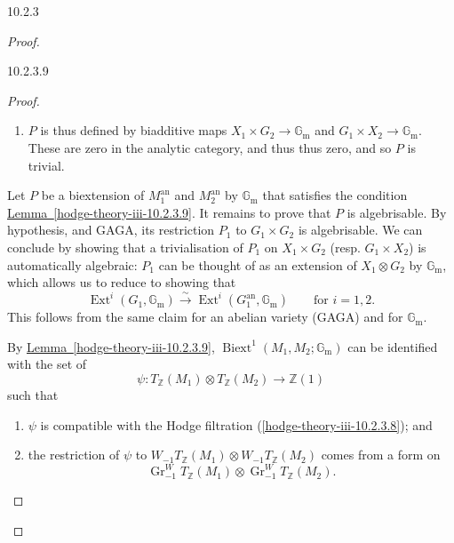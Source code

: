 \begin{construction}{10.2.3}
\begin{proof}
\begin{lemma}{10.2.3.9}
\begin{proof}
\begin{enumerate}
            
 \item[(b)]
              \(P\) is thus defined by biadditive maps \(X_1\times  G_2\to \mathbb {G}_\mathrm {m}\) and \(G_1\times  X_2\to \mathbb {G}_\mathrm {m}\).
              These are zero in the analytic category, and thus thus zero, and so \(P\) is trivial.
            

          \end{enumerate}\par{}Let \(P\) be a biextension of \(M_1^\mathrm {an}\) and \(M_2^\mathrm {an}\) by \(\mathbb {G}_\mathrm {m}\) that satisfies the condition \hyperref[hodge-theory-iii-10.2.3.9]{Lemma~\ref*{hodge-theory-iii-10.2.3.9}}.
          It remains to prove that \(P\) is algebrisable.
          By hypothesis, and GAGA, its restriction \(P_1\) to \(G_1\times  G_2\) is algebrisable.
          We can conclude by showing that a trivialisation of \(P_1\) on \(X_1\times  G_2\) (resp. \(G_1\times  X_2\)) is automatically algebraic: \(P_1\) can be thought of as an extension of \(X_1\otimes  G_2\) by \(\mathbb {G}_\mathrm {m}\), which allows us to reduce to showing that
          \[             \operatorname {Ext}^i(G_1,\mathbb {G}_\mathrm {m})             \xrightarrow {\sim } \operatorname {Ext}^i(G_1^\mathrm {an},\mathbb {G}_\mathrm {m})             \qquad \text {for }i=1,2.           \]
          This follows from the same claim for an abelian variety (GAGA) and for \(\mathbb {G}_\mathrm {m}\).\par{}By \hyperref[hodge-theory-iii-10.2.3.9]{Lemma~\ref*{hodge-theory-iii-10.2.3.9}}, \(\operatorname {Biext}^1(M_1,M_2;\mathbb {G}_\mathrm {m})\) can be identified with the set of
          \[             \psi \colon              T_\mathbb {Z}(M_1)\otimes  T_\mathbb {Z}(M_2)             \to  \mathbb {Z}(1)           \]
          such that

          
 \begin{enumerate}
            
 \item[(a)]
              \(\psi \) is compatible with the Hodge filtration (\cref{hodge-theory-iii-10.2.3.8}); and
            

            
 \item[(b)]
              the restriction of \(\psi \) to \(W_{-1}T_\mathbb {Z}(M_1)\otimes  W_{-1}T_\mathbb {Z}(M_2)\) comes from a form on
              \[                 \operatorname {Gr}_{-1}^WT_\mathbb {Z}(M_1)\otimes \operatorname {Gr}_{-1}^WT_\mathbb {Z}(M_2).               \]
            


\end{enumerate}
\end{proof}
\end{lemma}
\end{proof}
\end{construction}
